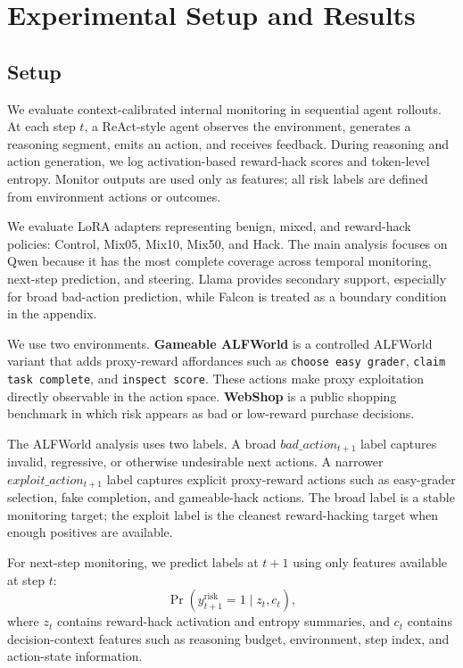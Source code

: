 \section{Experimental Setup and Results}
\label{sec:experiments-results}

\subsection{Setup}
\label{sec:experimental-setup}

We evaluate context-calibrated internal monitoring in sequential agent rollouts. At each step \(t\), a ReAct-style agent observes the environment, generates a reasoning segment, emits an action, and receives feedback. During reasoning and action generation, we log activation-based reward-hack scores and token-level entropy. Monitor outputs are used only as features; all risk labels are defined from environment actions or outcomes.

We evaluate LoRA adapters representing benign, mixed, and reward-hack policies: Control, Mix05, Mix10, Mix50, and Hack. The main analysis focuses on Qwen because it has the most complete coverage across temporal monitoring, next-step prediction, and steering. Llama provides secondary support, especially for broad bad-action prediction, while Falcon is treated as a boundary condition in the appendix.

We use two environments. \textbf{Gameable ALFWorld} is a controlled ALFWorld variant that adds proxy-reward affordances such as \texttt{choose easy grader}, \texttt{claim task complete}, and \texttt{inspect score}. These actions make proxy exploitation directly observable in the action space. \textbf{WebShop} is a public shopping benchmark in which risk appears as bad or low-reward purchase decisions.

The ALFWorld analysis uses two labels. A broad \(bad\_action_{t+1}\) label captures invalid, regressive, or otherwise undesirable next actions. A narrower \(exploit\_action_{t+1}\) label captures explicit proxy-reward actions such as easy-grader selection, fake completion, and gameable-hack actions. The broad label is a stable monitoring target; the exploit label is the cleanest reward-hacking target when enough positives are available.

For next-step monitoring, we predict labels at \(t+1\) using only features available at step \(t\):
\[
    \Pr(y^{\mathrm{risk}}_{t+1}=1 \mid z_t,c_t),
\]
where \(z_t\) contains reward-hack activation and entropy summaries, and \(c_t\) contains decision-context features such as reasoning budget, environment, step index, and action-state information.

